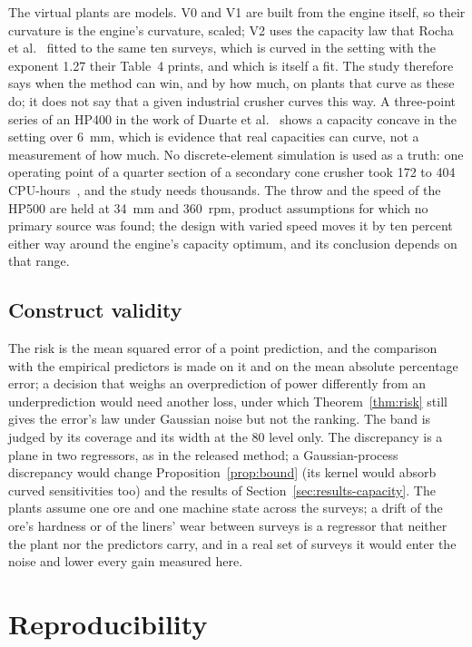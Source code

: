 The virtual plants are models. V0 and V1 are built from the engine itself, so their curvature is the engine's curvature,
scaled; V2 uses the capacity law that Rocha et al.~\cite{rocha} fitted to the same ten surveys, which is curved in the setting
with the exponent 1.27 their Table~4 prints, and which is itself a fit. The study therefore says when the method can win,
and by how much, on plants that curve as these do; it does not say that a given industrial crusher curves this way. A
three-point series of an HP400 in the work of Duarte et al.~\cite{duarte} shows a capacity concave in the setting over 6~mm,
which is evidence that real capacities can curve, not a measurement of how much. No discrete-element simulation is used as a
truth: one operating point of a quarter section of a secondary cone crusher took 172 to 404 CPU-hours~\cite{quistthesis}, and
the study needs thousands. The throw and the speed of the HP500 are held at 34~mm and 360~rpm, product assumptions for which no
primary source was found; the design with varied speed moves it by ten percent either way around the engine's capacity
optimum, and its conclusion depends on that range.

\subsection{Construct validity}

The risk is the mean squared error of a point prediction, and the comparison with the empirical predictors is made on it and
on the mean absolute percentage error; a decision that weighs an overprediction of power differently from an underprediction
would need another loss, under which Theorem~\ref{thm:risk} still gives the error's law under Gaussian noise but not the
ranking. The band is judged by its coverage and its width at the 80\pct{} level only. The discrepancy is a plane in two
regressors, as in the released method; a Gaussian-process discrepancy would change Proposition~\ref{prop:bound} (its kernel
would absorb curved sensitivities too) and the results of Section~\ref{sec:results-capacity}. The plants assume one ore and one
machine state across the surveys; a drift of the ore's hardness or of the liners' wear between surveys is a regressor that
neither the plant nor the predictors carry, and in a real set of surveys it would enter the noise and lower every gain measured here.

\section{Reproducibility}\label{sec:repro}

